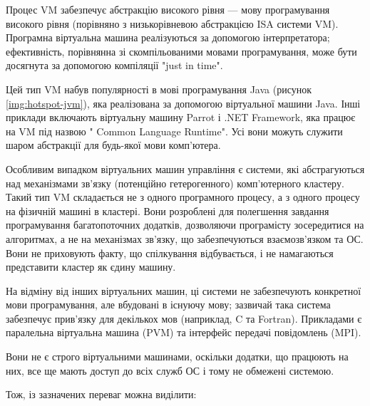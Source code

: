 \documentclass{lib/styles/default-style}
\begin{document}
    Процес VM забезпечує абстракцію високого рівня
    --- мову програмування високого рівня (порівняно з низькорівневою абстракцією ISA системи VM).
    Програмна віртуальна машина реалізуються за допомогою інтерпретатора;
    ефективність, порівнянна зі скомпільованими мовами програмування, може бути досягнута за допомогою компіляції "just in time".


    Цей тип VM набув популярності в мові програмування Java (рисунок \ref{img:hotspot-jvm}), яка реалізована за допомогою віртуальної машини Java.
    Інші приклади включають віртуальну машину Parrot і .NET Framework, яка працює на VM під назвою " Common Language Runtime".
    Усі вони можуть служити шаром абстракції для будь-якої мови комп'ютера.
    
    
    Особливим випадком віртуальних машин управління є системи,
    які абстрагуються над механізмами зв'язку (потенційно гетерогенного) комп'ютерного кластеру.
    Такий тип VM складається не з одного програмного процесу, а з одного процесу на фізичній машині в кластері.
    Вони розроблені для полегшення завдання програмування багатопоточних додатків, дозволяючи програмісту зосередитися на алгоритмах,
    а не на механізмах зв'язку, що забезпечуються взаємозв'язком та ОС.
    Вони не приховують факту, що спілкування відбувається, і не намагаються представити кластер як єдину машину.

    На відміну від інших віртуальних машин, ці системи не забезпечують конкретної мови програмування,
    але вбудовані в існуючу мову;
    зазвичай така система забезпечує прив'язку для декількох мов (наприклад, C та Fortran).
    Прикладами є паралельна віртуальна машина (PVM)
    та інтерфейс передачі повідомлень (MPI).
    
    Вони не є строго віртуальними машинами, оскільки додатки, що працюють на них, все ще мають
    доступ до всіх служб ОС і тому не обмежені системою.

    Тож, із зазначених переваг можна виділити:
\end{document}
